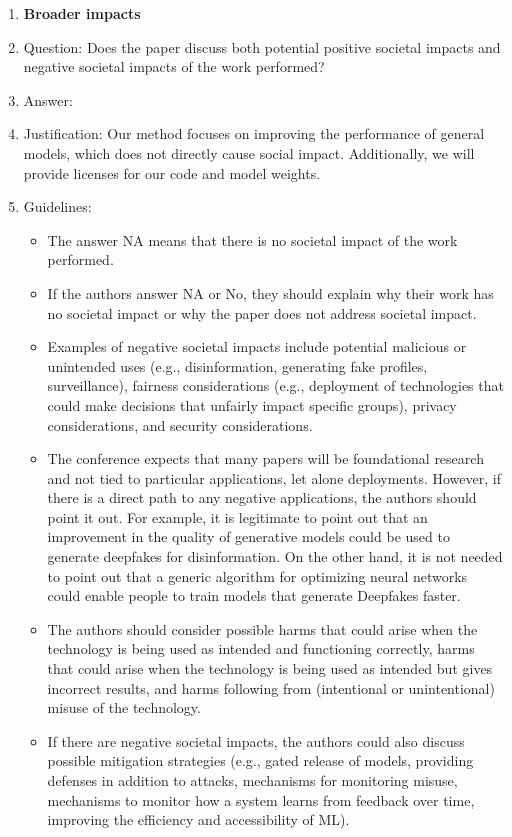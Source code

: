 \documentclass{article}
\begin{document}
\begin{enumerate}
\item {\bf Broader impacts}
    \item[] Question: Does the paper discuss both potential positive societal impacts and negative societal impacts of the work performed?
    \item[] Answer: \answerNo{} %
    \item[] Justification: Our method focuses on improving the performance of general models, which does not directly cause social impact. Additionally, we will provide licenses for our code and model weights.
    \item[] Guidelines:
    \begin{itemize}
        \item The answer NA means that there is no societal impact of the work performed.
        \item If the authors answer NA or No, they should explain why their work has no societal impact or why the paper does not address societal impact.
        \item Examples of negative societal impacts include potential malicious or unintended uses (e.g., disinformation, generating fake profiles, surveillance), fairness considerations (e.g., deployment of technologies that could make decisions that unfairly impact specific groups), privacy considerations, and security considerations.
        \item The conference expects that many papers will be foundational research and not tied to particular applications, let alone deployments. However, if there is a direct path to any negative applications, the authors should point it out. For example, it is legitimate to point out that an improvement in the quality of generative models could be used to generate deepfakes for disinformation. On the other hand, it is not needed to point out that a generic algorithm for optimizing neural networks could enable people to train models that generate Deepfakes faster.
        \item The authors should consider possible harms that could arise when the technology is being used as intended and functioning correctly, harms that could arise when the technology is being used as intended but gives incorrect results, and harms following from (intentional or unintentional) misuse of the technology.
        \item If there are negative societal impacts, the authors could also discuss possible mitigation strategies (e.g., gated release of models, providing defenses in addition to attacks, mechanisms for monitoring misuse, mechanisms to monitor how a system learns from feedback over time, improving the efficiency and accessibility of ML).
    \end{itemize}
    

\end{enumerate}
\end{document}
